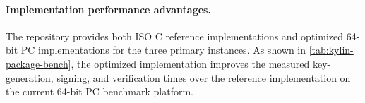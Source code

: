 \paragraph{Implementation performance advantages.}
The repository provides both ISO C reference implementations and optimized 64-bit PC implementations for the three primary instances. As shown in \cref{tab:kylin-package-bench}, the optimized implementation improves the measured key-generation, signing, and verification times over the reference implementation on the current 64-bit PC benchmark platform.
